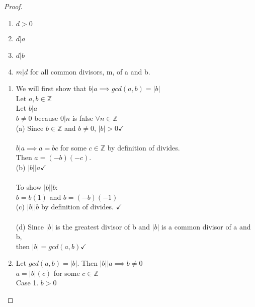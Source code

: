\documentclass[11 pt]{article}
\theoremstyle{definition}
\theoremstyle{definition}
\def\ZZ{\mathbb{Z}}
\def\divides{\big |}
\def\ord#1{|{#1}|}
\begin{document}
\begin{enumerate}
\begin{enumerate}
\begin{proof}
                \begin{enumerate}[label=(\alph*)]
                    \item $d>0$
                    \item $d \divides a$
                    \item $d \divides b$
                    \item $m \divides d$ for all common divisors, m, of a and b.
                \end{enumerate}
            \begin{enumerate}
                \item We will first show that $b \divides a \implies gcd(a,b)=\ord b$\\
                    Let $a,b \in \ZZ$\\
                    Let $b|a$\\
                    $b \neq 0$ because $0 \divides n$ is false $\forall n \in \ZZ$\\
                    (a) Since $b \in \ZZ$ and $b \neq 0$, $\ord b > 0 \checkmark$\\
                    \\
                    $b \divides a \implies a=bc$ for some $c \in \ZZ$ by definition of divides.\\
                    Then $a = (-b)(-c)$.\\
                    (b) $\ord b \divides a \checkmark$\\
                    \\
                    To show $\ord b \divides b$:\\
                    $b = b(1)$ and $b = (-b)(-1)$\\
                    (c) $\ord b \divides b$ by definition of divides. $\checkmark$\\
                    \\
                    (d) Since $\ord b$ is the greatest divisor of b and $\ord b$ is a common divisor of a and b,\\
                        then $\ord b = gcd(a,b) \checkmark$\\
                    \item Let $gcd(a,b) = \ord b$.
                        Then $\ord b \divides a \implies b \neq 0$\\
                        $a = \ord b (c)$ for some $c \in \ZZ$\\
                        Case 1. $b > 0$\\

\end{enumerate}
\end{proof}
\end{enumerate}
\end{enumerate}
\end{document}
